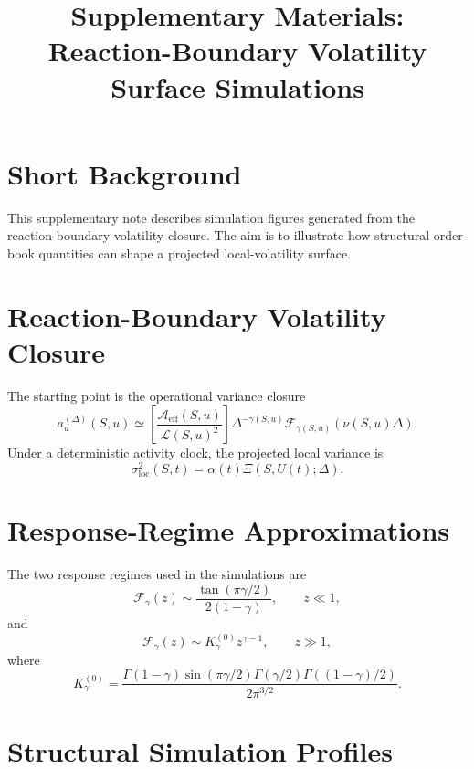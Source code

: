 \documentclass[11pt]{article}
\title{Supplementary Materials:\\Reaction-Boundary Volatility Surface Simulations}
\author{}
\date{}
\begin{document}
\maketitle

\section{Short Background}

This supplementary note describes simulation figures generated from the
reaction-boundary volatility closure. The aim is to illustrate how structural
order-book quantities can shape a projected local-volatility surface.

\section{Reaction-Boundary Volatility Closure}

The starting point is the operational variance closure
\begin{equation}
 a_u^{(\Delta)}(S,u)
 \simeq
 \left[
 \frac{\mathcal A_{\mathrm{eff}}(S,u)}
      {\mathcal L(S,u)^2}
 \right]
 \Delta^{-\gamma(S,u)}
 \mathcal F_{\gamma(S,u)}\!\left(\nu(S,u)\Delta\right).
\end{equation}
Under a deterministic activity clock, the projected local variance is
\begin{equation}
 \sigma_{\mathrm{loc}}^2(S,t)
 =
 \alpha(t)\Xi(S,U(t);\Delta).
\end{equation}

\section{Response-Regime Approximations}

The two response regimes used in the simulations are
\begin{equation}
 \mathcal F_\gamma(z)
 \sim
 \frac{\tan(\pi\gamma/2)}{2(1-\gamma)},
 \qquad z\ll1,
\end{equation}
and
\begin{equation}
 \mathcal F_\gamma(z)
 \sim
 K_\gamma^{(0)}z^{\gamma-1},
 \qquad z\gg1,
\end{equation}
where
\begin{equation}
 K_\gamma^{(0)}
 =
 \frac{
 \Gamma(1-\gamma)\sin(\pi\gamma/2)
 \Gamma(\gamma/2)\Gamma((1-\gamma)/2)
 }{2\pi^{3/2}}.
\end{equation}

\section{Structural Simulation Profiles}
\end{document}
